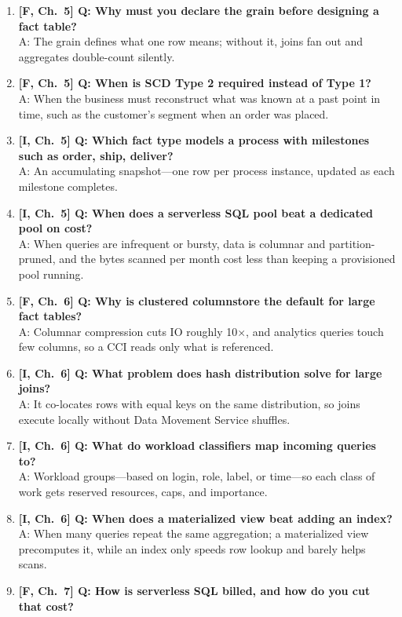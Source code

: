 \begin{enumerate}
    \item \textbf{[F, Ch.~5] Q: Why must you declare the grain before designing a fact table?}\\
    A: The grain defines what one row means; without it, joins fan out and aggregates double-count silently.
    \item \textbf{[F, Ch.~5] Q: When is SCD Type 2 required instead of Type 1?}\\
    A: When the business must reconstruct what was known at a past point in time, such as the customer's segment when an order was placed.
    \item \textbf{[I, Ch.~5] Q: Which fact type models a process with milestones such as order, ship, deliver?}\\
    A: An accumulating snapshot---one row per process instance, updated as each milestone completes.
    \item \textbf{[I, Ch.~5] Q: When does a serverless SQL pool beat a dedicated pool on cost?}\\
    A: When queries are infrequent or bursty, data is columnar and partition-pruned, and the bytes scanned per month cost less than keeping a provisioned pool running.
    \item \textbf{[F, Ch.~6] Q: Why is clustered columnstore the default for large fact tables?}\\
    A: Columnar compression cuts IO roughly 10$\times$, and analytics queries touch few columns, so a CCI reads only what is referenced.
    \item \textbf{[I, Ch.~6] Q: What problem does hash distribution solve for large joins?}\\
    A: It co-locates rows with equal keys on the same distribution, so joins execute locally without Data Movement Service shuffles.
    \item \textbf{[I, Ch.~6] Q: What do workload classifiers map incoming queries to?}\\
    A: Workload groups---based on login, role, label, or time---so each class of work gets reserved resources, caps, and importance.
    \item \textbf{[I, Ch.~6] Q: When does a materialized view beat adding an index?}\\
    A: When many queries repeat the same aggregation; a materialized view precomputes it, while an index only speeds row lookup and barely helps scans.
    \item \textbf{[F, Ch.~7] Q: How is serverless SQL billed, and how do you cut that cost?}\\

\end{enumerate}
